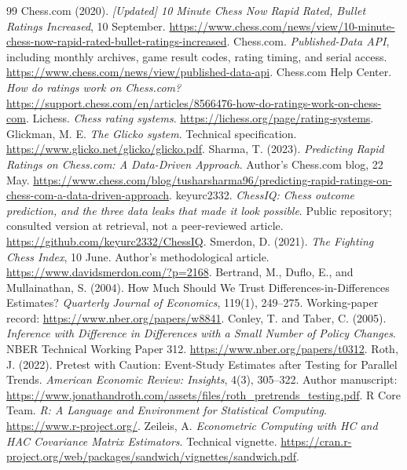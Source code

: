 \documentclass[11pt,a4paper]{article}
\begin{document}
\begin{thebibliography}{99}
 Chess.com (2020). \emph{[Updated] 10 Minute Chess Now Rapid Rated, Bullet Ratings Increased}, 10 September. \url{https://www.chess.com/news/view/10-minute-chess-now-rapid-rated-bullet-ratings-increased}.
 Chess.com. \emph{Published-Data API}, including monthly archives, game result codes, rating timing, and serial access. \url{https://www.chess.com/news/view/published-data-api}.
 Chess.com Help Center. \emph{How do ratings work on Chess.com?} \url{https://support.chess.com/en/articles/8566476-how-do-ratings-work-on-chess-com}.
 Lichess. \emph{Chess rating systems}. \url{https://lichess.org/page/rating-systems}.
 Glickman, M. E. \emph{The Glicko system}. Technical specification. \url{https://www.glicko.net/glicko/glicko.pdf}.
 Sharma, T. (2023). \emph{Predicting Rapid Ratings on Chess.com: A Data-Driven Approach}. Author's Chess.com blog, 22 May. \url{https://www.chess.com/blog/tusharsharma96/predicting-rapid-ratings-on-chess-com-a-data-driven-approach}.
 keyurc2332. \emph{ChessIQ: Chess outcome prediction, and the three data leaks that made it look possible}. Public repository; consulted version at retrieval, not a peer-reviewed article. \url{https://github.com/keyurc2332/ChessIQ}.
 Smerdon, D. (2021). \emph{The Fighting Chess Index}, 10 June. Author's methodological article. \url{https://www.davidsmerdon.com/?p=2168}.
 Bertrand, M., Duflo, E., and Mullainathan, S. (2004). How Much Should We Trust Differences-in-Differences Estimates? \emph{Quarterly Journal of Economics}, 119(1), 249--275. Working-paper record: \url{https://www.nber.org/papers/w8841}.
 Conley, T. and Taber, C. (2005). \emph{Inference with Difference in Differences with a Small Number of Policy Changes}. NBER Technical Working Paper 312. \url{https://www.nber.org/papers/t0312}.
 Roth, J. (2022). Pretest with Caution: Event-Study Estimates after Testing for Parallel Trends. \emph{American Economic Review: Insights}, 4(3), 305--322. Author manuscript: \url{https://www.jonathandroth.com/assets/files/roth_pretrends_testing.pdf}.
 R Core Team. \emph{R: A Language and Environment for Statistical Computing}. \url{https://www.r-project.org/}.
 Zeileis, A. \emph{Econometric Computing with HC and HAC Covariance Matrix Estimators}. Technical vignette. \url{https://cran.r-project.org/web/packages/sandwich/vignettes/sandwich.pdf}.
\end{thebibliography}
\end{document}
